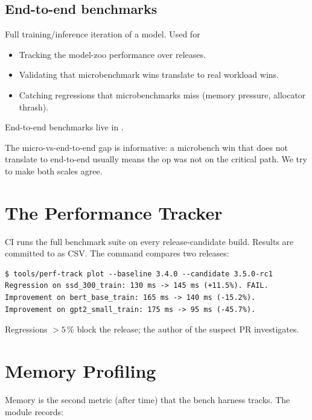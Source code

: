 \subsection{End-to-end benchmarks}
\label{ssec:perf_methodology:e2e}

Full training/inference iteration of a model. Used for
\begin{itemize}
  \item Tracking the model-zoo performance over releases.
  \item Validating that microbenchmark wins translate to
    real workload wins.
  \item Catching regressions that microbenchmarks miss
    (memory pressure, allocator thrash).
\end{itemize}

End-to-end benchmarks live in .

The micro-vs-end-to-end gap is informative: a microbench win
that does not translate to end-to-end usually means the op was
not on the critical path. We try to make both scales agree.

\section{The Performance Tracker}
\label{sec:perf_methodology:perf_tracker}

CI runs the full benchmark suite on every release-candidate
build. Results are committed to
 as CSV. The
 command compares two releases:

\begin{lstlisting}[style=lucid,language=LucidPython]
$ tools/perf-track plot --baseline 3.4.0 --candidate 3.5.0-rc1
Regression on ssd_300_train: 130 ms -> 145 ms (+11.5%). FAIL.
Improvement on bert_base_train: 165 ms -> 140 ms (-15.2%).
Improvement on gpt2_small_train: 175 ms -> 95 ms (-45.7%).
\end{lstlisting}

Regressions $>5$\,\% block the release; the author of the
suspect PR investigates.

\section{Memory Profiling}
\label{sec:perf_methodology:memory_profiling}

Memory is the second metric (after time) that the bench harness
tracks. The  module records:

